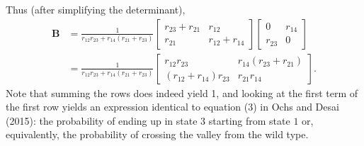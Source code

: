 \documentclass[10pt]{revtex4}
\begin{document}
Thus (after simplifying the determinant),
\begin{align}
\textbf{B} & =
\frac{1}{r_{12}r_{23} + r_{14}(r_{21}+r_{23})}
\begin{bmatrix}
r_{23} + r_{21} & r_{12}\\
r_{21} & r_{12} + r_{14}
\end{bmatrix}
\begin{bmatrix}
0 & r_{14} \\
r_{23} & 0
\end{bmatrix}
\nonumber \\
& =
\frac{1}{r_{12}r_{23} + r_{14}(r_{21}+r_{23})}
\begin{bmatrix}
r_{12}r_{23} & r_{14}(r_{23}+r_{21}) \\
(r_{12}+r_{14})r_{23} & r_{21}r_{14}
\end{bmatrix}.
\end{align}
Note that summing the rows does indeed yield 1, and looking at the first term of the first row yields an expression identical to equation (3) in Ochs and Desai (2015): the probability of ending up in state $3$ starting from state $1$ or, equivalently, the probability of crossing the valley from the wild type.
\end{document}

